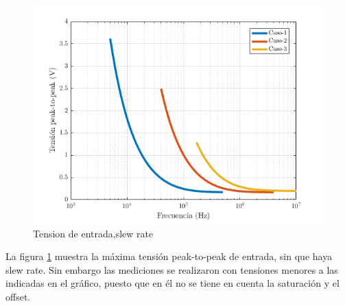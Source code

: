 \documentclass[../../main.tex]{subfiles}
\begin{document}
\begin{figure}[H]
\centering
\includegraphics[width=1\textwidth]{imagenes/slew-rate-n.png}
\caption{Tension de entrada,slew rate} \label{fig=srn}
\end{figure}

La figura \ref{fig=srn} muestra la máxima tensión peak-to-peak de entrada, sin que haya slew rate. Sin embargo las mediciones se realizaron con tensiones menores a las indicadas en el gráfico, puesto que en él no se tiene en cuenta la saturación  y el offset.
\end{document}
